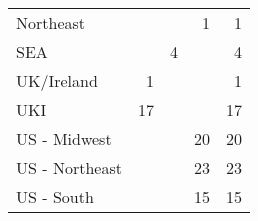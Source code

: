 \begin{table}[]
\begin{tabular}{@{}lrrrr@{}}
\multicolumn{1}{l|}{Northeast}                                      &                                                             &                                                                       & 1                                                                    & 1                                                                  \\
\multicolumn{1}{l|}{SEA}                                            &                                                             & 4                                                                     &                                                                      & 4                                                                  \\
\multicolumn{1}{l|}{UK/Ireland}                                     & 1                                                           &                                                                       &                                                                      & 1                                                                  \\
\multicolumn{1}{l|}{UKI}                                            & 17                                                          &                                                                       &                                                                      & 17                                                                 \\
\multicolumn{1}{l|}{US - Midwest}                                   &                                                             &                                                                       & 20                                                                   & 20                                                                 \\
\multicolumn{1}{l|}{US - Northeast}                                 &                                                             &                                                                       & 23                                                                   & 23                                                                 \\
\multicolumn{1}{l|}{US - South}                                     &                                                             &                                                                       & 15                                                                   & 15                                                                 \\

\end{tabular}
\end{table}
